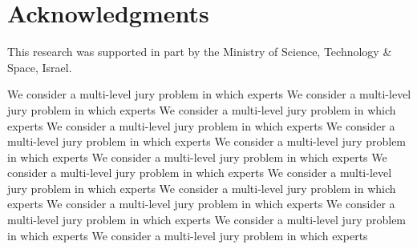 \documentclass[letterpaper]{article} %
\begin{document}










\section{Acknowledgments}
This research was supported in part by the Ministry of Science, Technology \& Space, Israel.

%
We consider a multi-level jury problem in which experts
We consider a multi-level jury problem in which experts
We consider a multi-level jury problem in which experts
We consider a multi-level jury problem in which experts
We consider a multi-level jury problem in which experts
We consider a multi-level jury problem in which experts
We consider a multi-level jury problem in which experts
We consider a multi-level jury problem in which experts
We consider a multi-level jury problem in which experts
We consider a multi-level jury problem in which experts
We consider a multi-level jury problem in which experts
We consider a multi-level jury problem in which experts
We consider a multi-level jury problem in which experts
We consider a multi-level jury problem in which experts
\clearpage

\end{document}
